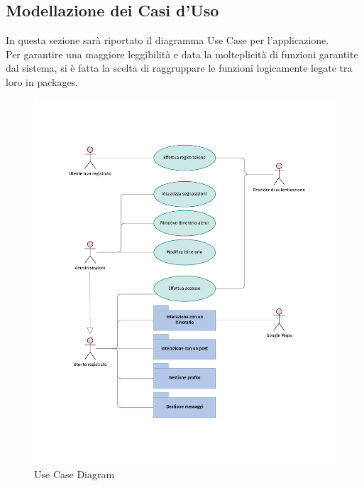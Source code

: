\documentclass{natourDoc}
\begin{document}
	\newpage

	\newpage
	\subsection{Modellazione dei Casi d'Uso}
	In questa sezione sarà riportato il diagramma Use Case per l'applicazione.\\
	Per garantire una maggiore leggibilità e data la molteplicità di funzioni garantite
	dal sistema, si è fatta la scelta di raggruppare le funzioni logicamente legate 
	tra loro in packages.

	\begin{figure}[!htbp]
		\centering
		\includegraphics[width=\textwidth, page=1]{./diagrams/useCase.pdf}
		\caption{Use Case Diagram}
	\end{figure}
	\FloatBarrier

	\newpage
\end{document}
